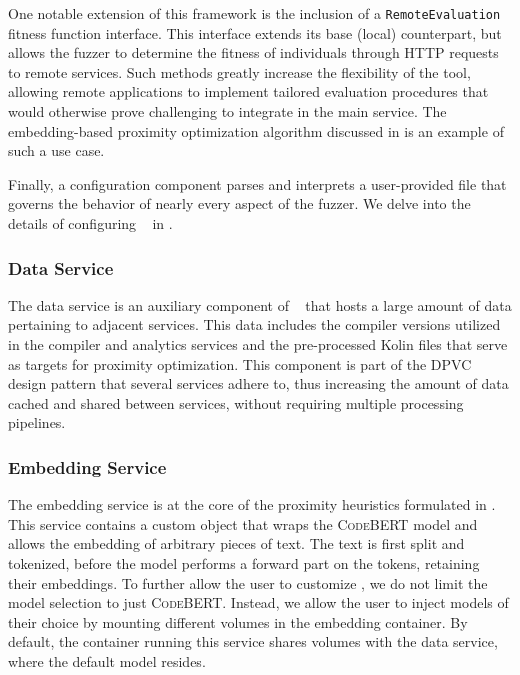 One notable extension of this framework is the inclusion of a \texttt{RemoteEvaluation}
fitness function interface.
This interface extends its base (local) counterpart,
but allows the fuzzer to determine the fitness of individuals through HTTP requests
to remote services.
Such methods greatly increase the flexibility of the tool,
allowing remote applications to implement tailored evaluation procedures
that would otherwise prove challenging to integrate in the main service.
The embedding-based proximity optimization algorithm discussed in 
is an example of such a use case.

Finally, a configuration component parses and interprets a user-provided file
that governs the behavior of nearly every aspect of the fuzzer.
We delve into the details of configuring \kf~ in .

\subsubsection{Data Service}


The data service is an auxiliary component of \kf~ that hosts
a large amount of data pertaining to adjacent services.
This data includes the compiler versions utilized in the compiler
and analytics services and the pre-processed Kolin files
that serve as targets for proximity optimization.
This component is part of the \gls{DPVC} design pattern
that several services adhere to,
thus increasing the amount of data cached and shared between
services, without requiring multiple processing pipelines.

\subsubsection{Embedding Service}

The embedding service is at the core of the proximity heuristics
formulated in .
This service contains a custom object that wraps the
\textsc{CodeBERT} model and allows the embedding of arbitrary pieces of text.
The text is first split and tokenized,
before the model performs a forward part 
on the tokens, retaining their embeddings.
To further allow the user to customize \kf, we
do not limit the model selection to just \textsc{CodeBERT}.
Instead, we allow the user to inject models of their choice
by mounting different volumes in the embedding container.
By default, the container running this service
shares volumes with the data service, where the default
model resides.

